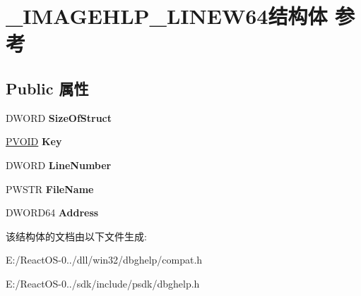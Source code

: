 \hypertarget{struct___i_m_a_g_e_h_l_p___l_i_n_e_w64}{}\section{\+\_\+\+I\+M\+A\+G\+E\+H\+L\+P\+\_\+\+L\+I\+N\+E\+W64结构体 参考}
\label{struct___i_m_a_g_e_h_l_p___l_i_n_e_w64}
\subsection*{Public 属性}
\begin{DoxyCompactItemize}
\item 
\mbox{\label{struct___i_m_a_g_e_h_l_p___l_i_n_e_w64_a92061c346bc79d7acc0c77be4b7661cb}} 
D\+W\+O\+RD {\bfseries Size\+Of\+Struct}
\item 
\mbox{\label{struct___i_m_a_g_e_h_l_p___l_i_n_e_w64_a51b26c9f379d40ac69acf4bd9d963f0e}} 
\hyperlink{interfacevoid}{P\+V\+O\+ID} {\bfseries Key}
\item 
\mbox{\label{struct___i_m_a_g_e_h_l_p___l_i_n_e_w64_a53dca01c0e833203171e696c5ced03d4}} 
D\+W\+O\+RD {\bfseries Line\+Number}
\item 
\mbox{\label{struct___i_m_a_g_e_h_l_p___l_i_n_e_w64_a9ad25981ce734666ac318c7b4a9940c1}} 
P\+W\+S\+TR {\bfseries File\+Name}
\item 
\mbox{\label{struct___i_m_a_g_e_h_l_p___l_i_n_e_w64_aaf5ec7dbd1b561a0ef37d654d7f55e27}} 
D\+W\+O\+R\+D64 {\bfseries Address}
\end{DoxyCompactItemize}


该结构体的文档由以下文件生成\+:\begin{DoxyCompactItemize}
\item 
E\+:/\+React\+O\+S-\/0../dll/win32/dbghelp/compat.\+h\item 
E\+:/\+React\+O\+S-\/0../sdk/include/psdk/dbghelp.\+h\end{DoxyCompactItemize}
